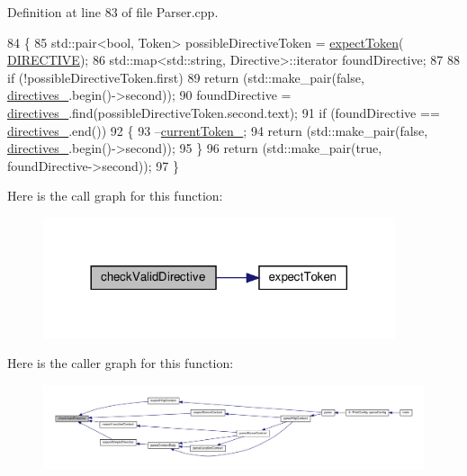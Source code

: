 Definition at line 83 of file Parser.\+cpp.


\begin{DoxyCode}
84     \{
85         std::pair<bool, Token> possibleDirectiveToken = \hyperlink{classft_1_1_parser_a1615a752d3642bb53598e2c8db810db0}{expectToken}(
      \hyperlink{namespaceft_aa520fbf142ba1e7e659590c07da31921ae3852cb010d5e422026faf83b3c16f0e}{DIRECTIVE});
86         std::map<std::string, Directive>::iterator foundDirective;
87 
88         \textcolor{keywordflow}{if} (!possibleDirectiveToken.first)
89             \textcolor{keywordflow}{return} (std::make\_pair(\textcolor{keyword}{false}, \hyperlink{classft_1_1_parser_abe21d1e60d970dd268181e79250b5399}{directives\_}.begin()->second)); 
90         foundDirective = \hyperlink{classft_1_1_parser_abe21d1e60d970dd268181e79250b5399}{directives\_}.find(possibleDirectiveToken.second.text);
91         \textcolor{keywordflow}{if} (foundDirective == \hyperlink{classft_1_1_parser_abe21d1e60d970dd268181e79250b5399}{directives\_}.end())
92         \{
93             --\hyperlink{classft_1_1_parser_a942c5b794d108f144c5b5028aaa34cb6}{currentToken\_};
94             \textcolor{keywordflow}{return} (std::make\_pair(\textcolor{keyword}{false}, \hyperlink{classft_1_1_parser_abe21d1e60d970dd268181e79250b5399}{directives\_}.begin()->second)); 
95         \}
96         \textcolor{keywordflow}{return} (std::make\_pair(\textcolor{keyword}{true}, foundDirective->second)); 
97     \}
\end{DoxyCode}
Here is the call graph for this function\+:\nopagebreak
\begin{figure}[H]
\begin{center}
\leavevmode
\includegraphics[width=293pt]{classft_1_1_parser_ad48298d21629daf7c9a31e101bf322ba_cgraph}
\end{center}
\end{figure}
Here is the caller graph for this function\+:
\nopagebreak
\begin{figure}[H]
\begin{center}
\leavevmode
\includegraphics[width=350pt]{classft_1_1_parser_ad48298d21629daf7c9a31e101bf322ba_icgraph}
\end{center}
\end{figure}
\mbox{\label{classft_1_1_parser_a31501116433b0b1f8d9d58f27658ea98}} 

